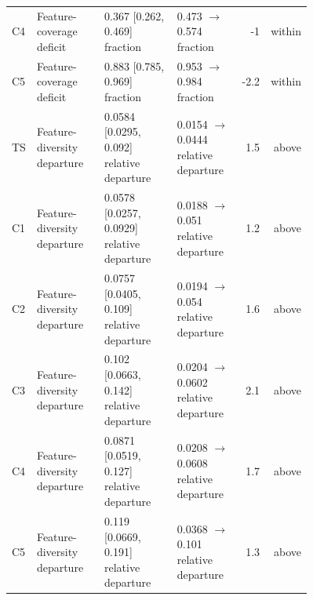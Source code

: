 \begin{supertabular}{p{0.055\linewidth}p{0.23\linewidth}p{0.25\linewidth}p{0.22\linewidth}rr}
C4 & Feature-coverage deficit & 0.367 [0.262, 0.469] fraction & 0.473 $\rightarrow$ 0.574 fraction & -1 & within \\
C5 & Feature-coverage deficit & 0.883 [0.785, 0.969] fraction & 0.953 $\rightarrow$ 0.984 fraction & -2.2 & within \\
TS & Feature-diversity departure & 0.0584 [0.0295, 0.092] relative departure & 0.0154 $\rightarrow$ 0.0444 relative departure & 1.5 & above \\
C1 & Feature-diversity departure & 0.0578 [0.0257, 0.0929] relative departure & 0.0188 $\rightarrow$ 0.051 relative departure & 1.2 & above \\
C2 & Feature-diversity departure & 0.0757 [0.0405, 0.109] relative departure & 0.0194 $\rightarrow$ 0.054 relative departure & 1.6 & above \\
C3 & Feature-diversity departure & 0.102 [0.0663, 0.142] relative departure & 0.0204 $\rightarrow$ 0.0602 relative departure & 2.1 & above \\
C4 & Feature-diversity departure & 0.0871 [0.0519, 0.127] relative departure & 0.0208 $\rightarrow$ 0.0608 relative departure & 1.7 & above \\
C5 & Feature-diversity departure & 0.119 [0.0669, 0.191] relative departure & 0.0368 $\rightarrow$ 0.101 relative departure & 1.3 & above \\
\hline
\end{supertabular}
